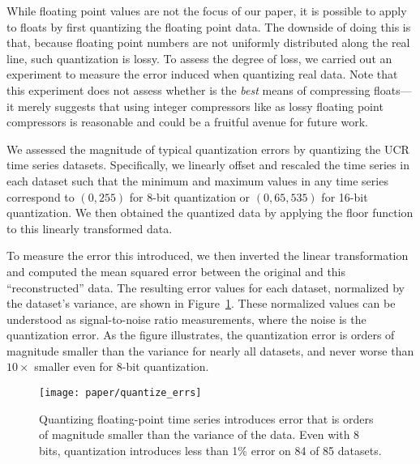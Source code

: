 
While floating point values are not the focus of our paper, it is possible to apply \minesp to floats by first quantizing the floating point data. The downside of doing this is that, because floating point numbers are not uniformly distributed along the real line, such quantization is lossy. To assess the degree of loss, we carried out an experiment to measure the error induced when quantizing real data. Note that this experiment does not assess whether \minesp is the \textit{best} means of compressing floats---it merely suggests that using integer compressors like \minesp as lossy floating point compressors is reasonable and could be a fruitful avenue for future work. %

We assessed the magnitude of typical quantization errors by quantizing the UCR time series datasets. Specifically, we linearly offset and rescaled the time series in each dataset such that the minimum and maximum values in any time series correspond to $(0, 255)$ for 8-bit quantization or $(0, 65,535)$ for 16-bit quantization. We then obtained the quantized data by applying the floor function to this linearly transformed data.

To measure the error this introduced, we then inverted the linear transformation and computed the mean squared error between the original and this ``reconstructed'' data. The resulting error values for each dataset, normalized by the dataset's variance, are shown in Figure~\ref{fig:quantize_errs}. These normalized values can be understood as signal-to-noise ratio measurements, where the noise is the quantization error. As the figure illustrates, the quantization error is orders of magnitude smaller than the variance for nearly all datasets, and never worse than $10\times$ smaller even for 8-bit quantization.

\begin{figure}[h]
\begin{center}
    \texttt{[image: paper/quantize\_errs]}
    \caption{Quantizing floating-point time series introduces error that is orders of magnitude smaller than the variance of the data. Even with 8 bits, quantization introduces less than 1\% error on 84 of 85 datasets.}
    \label{fig:quantize_errs}
\end{center}
\end{figure}

